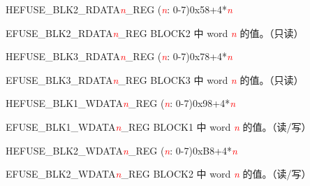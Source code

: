 \begin{register}{H}{EFUSE\_BLK2\_RDATA\textcolor{red}{\it{n}}\_REG (\textcolor{red}{\it{n}}: 0-7)}{0x58+4*\textcolor{red}{\it{n}}}\label{regdesc:EFUSEBLK2RDATAnREG}
%
\regnewline%
\begin{regdesc}\begin{reglist}
\item [EFUSE\_BLK2\_RDATA\textcolor{red}{\it{n}}\_REG]  BLOCK2 中 word \textcolor{red}{\textit{n}} 的值。（只读）
\end{reglist}\end{regdesc}
\end{register}


\begin{register}{H}{EFUSE\_BLK3\_RDATA\textcolor{red}{\it{n}}\_REG (\textcolor{red}{\it{n}}: 0-7)}{0x78+4*\textcolor{red}{\it{n}}}\label{regdesc:EFUSEBLK3RDATAnREG}
%
\regnewline%
\begin{regdesc}\begin{reglist}
\item [EFUSE\_BLK3\_RDATA\textcolor{red}{\it{n}}\_REG]  BLOCK3 中 word \textcolor{red}{\textit{n}} 的值。（只读）
\end{reglist}\end{regdesc}
\end{register}

\begin{register}{H}{EFUSE\_BLK1\_WDATA\textcolor{red}{\it{n}}\_REG (\textcolor{red}{\it{n}}: 0-7)}{0x98+4*\textcolor{red}{\it{n}}}\label{regdesc:EFUSEBLK1WDATAnREG}
%
\regnewline%
\begin{regdesc}\begin{reglist}
\item [EFUSE\_BLK1\_WDATA\textcolor{red}{\it{n}}\_REG]  BLOCK1 中 word \textcolor{red}{\textit{n}} 的值。（读/写）
\end{reglist}\end{regdesc}
\end{register}


\begin{register}{H}{EFUSE\_BLK2\_WDATA\textcolor{red}{\it{n}}\_REG (\textcolor{red}{\it{n}}: 0-7)}{0xB8+4*\textcolor{red}{\it{n}}}\label{regdesc:EFUSEBLK2WDATAnREG}
%
\regnewline%
\begin{regdesc}\begin{reglist}
\item [EFUSE\_BLK2\_WDATA\textcolor{red}{\it{n}}\_REG]  BLOCK2 中 word \textcolor{red}{\textit{n}} 的值。（读/写）
\end{reglist}\end{regdesc}
\end{register}


